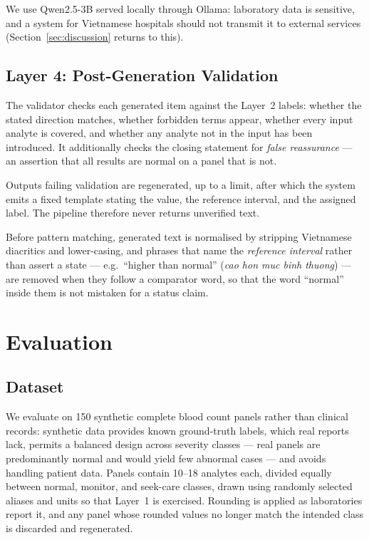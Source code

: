 \documentclass{svproc}
\begin{document}
We use Qwen2.5-3B served locally through Ollama: laboratory data is
sensitive, and a system for Vietnamese hospitals should not transmit it
to external services (Section~\ref{sec:discussion} returns to this).

\subsection{Layer 4: Post-Generation Validation}

The validator checks each generated item against the Layer~2 labels:
whether the stated direction matches, whether forbidden terms appear,
whether every input analyte is covered, and whether any analyte not in the
input has been introduced. It additionally checks the closing statement
for \emph{false reassurance} --- an assertion that all results are normal
on a panel that is not.

Outputs failing validation are regenerated, up to a limit, after which the
system emits a fixed template stating the value, the reference interval,
and the assigned label. The pipeline therefore never returns unverified
text.

Before pattern matching, generated text is normalised by stripping
Vietnamese diacritics and lower-casing, and phrases that name the
\emph{reference interval} rather than assert a state --- e.g.\ ``higher
than normal'' (\textit{cao hon muc binh thuong}) --- are removed when they
follow a comparator word, so that the word ``normal'' inside them is not
mistaken for a status claim.


\section{Evaluation}

\subsection{Dataset}

We evaluate on 150 synthetic complete blood count panels rather than
clinical records: synthetic data provides known ground-truth labels,
which real reports lack, permits a balanced design across severity
classes --- real panels are predominantly normal and would yield few
abnormal cases --- and avoids handling patient data. Panels contain
10--18 analytes each, divided equally between normal, monitor, and
seek-care classes, drawn using randomly selected aliases and units so
that Layer~1 is exercised. Rounding is applied as laboratories report it,
and any panel whose rounded values no longer match the intended class is
discarded and regenerated.
\end{document}
